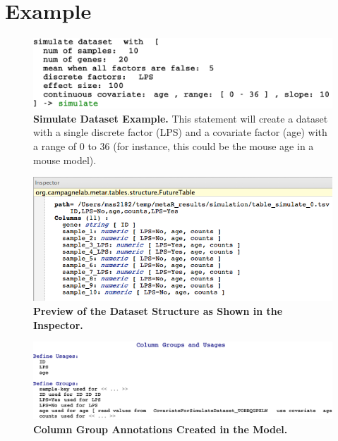 \section{Example}

\begin{figure}[h!tbp]
  \centering
  \includegraphics[width=\figWidthWide]{figures/SimulateStatementWithParameters.pdf}
\caption[SimulateDataset Example.]{\textbf{Simulate Dataset Example.} This statement will create a dataset with a single discrete factor (LPS) and a covariate factor (age) with a range of 0 to 36 (for instance, this could be the mouse age in a mouse model). }
\label{fig:SimulateDatasetExample}
\end{figure}


\begin{figure}[h!tbp]
  \centering
  \includegraphics[width=\figWidthWide]{figures/SimulateTableInspector.png}
\caption[Preview of the Dataset Structure as Shown in the Inspector.]{\textbf{Preview of the Dataset Structure as Shown in the Inspector.}}
\label{fig:SimulateDatasetInspector}
\end{figure}

\begin{figure}[h!tbp]
  \centering
  \includegraphics[width=\figWidthWide]{figures/SimulateGroups.pdf}
\caption[Column Group Annotations Created in the Model.]{\textbf{Column Group Annotations Created in the Model.}}
\label{fig:SimulateGroups}
\end{figure}

